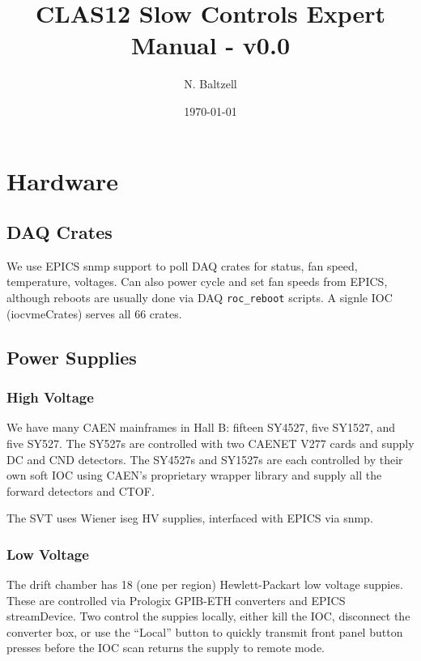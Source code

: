 \documentclass[amsmath,amssymb,notitlepage,11pt]{revtex4}
\begin{document}
\title{CLAS12 Slow Controls Expert Manual - v0.0}
\author{N. Baltzell}
\date{\today}
\begin{abstract}
\end{abstract}

\maketitle
\tableofcontents
\newpage

\section{Hardware}
\subsection{DAQ Crates}
We use EPICS snmp support to poll DAQ crates for status, fan speed, temperature, voltages.  Can also power cycle and set fan speeds from EPICS, although reboots are usually done via DAQ \texttt{roc\_reboot} scripts.  A signle IOC (iocvmeCrates) serves all 66 crates. 

\subsection{Power Supplies}
\subsubsection{High Voltage}
We have many CAEN mainframes in Hall B: fifteen SY4527, five SY1527, and five SY527.  The SY527s are controlled with two CAENET V277 cards and supply DC and CND detectors.  The SY4527s and SY1527s are each controlled by their own soft IOC using CAEN's proprietary wrapper library and supply all the forward detectors and CTOF.  

The SVT uses Wiener iseg HV supplies, interfaced with EPICS via snmp.

\subsubsection{Low Voltage}
The drift chamber has 18 (one per region) Hewlett-Packart low voltage suppies.  These are controlled via Prologix GPIB-ETH converters and EPICS streamDevice.  Two control the suppies locally, either kill the IOC, disconnect the converter box, or use the ``Local'' button to quickly transmit front panel button presses before the IOC scan returns the supply to remote mode.
\end{document}
